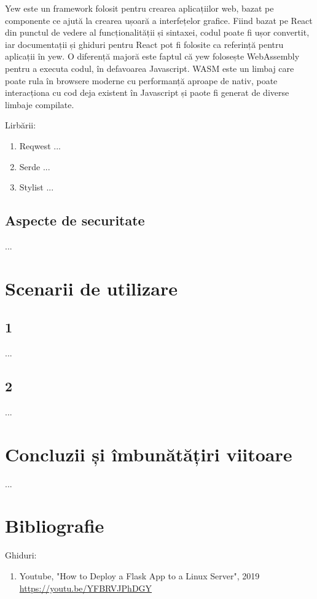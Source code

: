 \documentclass{article}
\begin{document}
    Yew este un framework folosit pentru crearea aplicațiilor web, bazat pe componente ce ajută la crearea ușoară a interfețelor grafice. Fiind bazat pe React din punctul de vedere al funcționalității și sintaxei, codul poate fi ușor convertit, iar documentații și ghiduri pentru React pot fi folosite ca referință pentru aplicații în yew. O diferență majoră este faptul că yew folosește WebAssembly pentru a executa codul, în defavoarea Javascript. WASM este un limbaj care poate rula în browsere moderne cu performanță aproape de nativ, poate interacționa cu cod deja existent în Javascript și paote fi generat de diverse limbaje compilate.

    Lirbării:
    \begin{enumerate}[noitemsep]
        \item Reqwest ...
        \item Serde ...
        \item Stylist ...
    \end{enumerate}
    
    \subsection{Aspecte de securitate}
    \label{Aspecte de securitate}
    ...
\newpage
\section{Scenarii de utilizare}
\label{Scenarii de utilizare}
    \subsection{1}
    \label{Scenarii de utilizare 1}
    ...
    \subsection{2}
    \label{Scenarii de utilizare 2}
    ...
\newpage
\section{Concluzii și îmbunătățiri viitoare}
\label{Concluzii și îmbunătățiri viitoare}
...
\newpage
\section{Bibliografie}
\label{Bibliografie}
Ghiduri:
\begin{enumerate}[noitemsep, leftmargin=0.3cm]
    \item Youtube, "How to Deploy a Flask App to a Linux Server", 2019\\
    \href{https://youtu.be/YFBRVJPhDGY}{https://youtu.be/YFBRVJPhDGY}
\end{enumerate}
\end{document}
